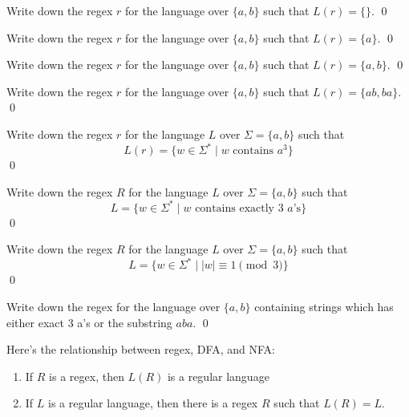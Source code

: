 \newpage
\begin{ex}
Write down the regex $r$ for the language over $\{a, b\}$ 
such that $L(r) = \{\}$.
\qed
\end{ex}


\newpage
\begin{ex}
Write down the regex $r$ for the language over $\{a, b\}$ 
such that $L(r) = \{a\}$.
\qed
\end{ex}


\newpage
\begin{ex}
Write down the regex $r$ for the language over $\{a, b\}$ 
such that $L(r) = \{a, b\}$.
\qed
\end{ex}

\newpage
\begin{ex}
Write down the regex $r$ for the language over $\{a, b\}$ 
such that $L(r) = \{ab, ba\}$.
\qed
\end{ex}

\newpage
\begin{ex}
Write down the regex $r$ for the language $L$ over $\Sigma = \{a, b\}$ 
such that 
\[
L(r) = \{w \in \Sigma^* \mid w \text{ contains $a^3$} \}
\]
\qed
\end{ex}

\newpage
\begin{ex}
Write down the regex $R$ for the language $L$ over $\Sigma = \{a, b\}$ 
such that 
\[
L = \{w \in \Sigma^* \mid w \text{ contains exactly 3 $a$'s} \}
\]
\qed
\end{ex}


\newpage
\begin{ex}
Write down the regex $R$ for the language $L$ over $\Sigma = \{a, b\}$ 
such that 
\[
L = \{w \in \Sigma^* \mid |w| \equiv 1 \pmod{3} \}
\]
\qed
\end{ex}


\newpage
\begin{ex}
 Write down the regex for the language over $\{a,b\}$ containing strings
  which has either exact 3 a's or the substring $aba$.
\qed
\end{ex}



\newpage
Here's the relationship between regex, DFA, and NFA:

\begin{thm}
  \begin{enumerate}[label=\textnormal{(\alph*)},itemsep=0pt,nosep,noitemsep,partopsep=0pt,topsep=0pt,parsep=0pt]
    \mbox{}
  \item If $R$ is a regex, then $L(R)$ is a regular
    language
  \item If $L$ is a regular language, then there is a regex $R$
    such that $L(R) = L$.
  \end{enumerate}
\end{thm}

